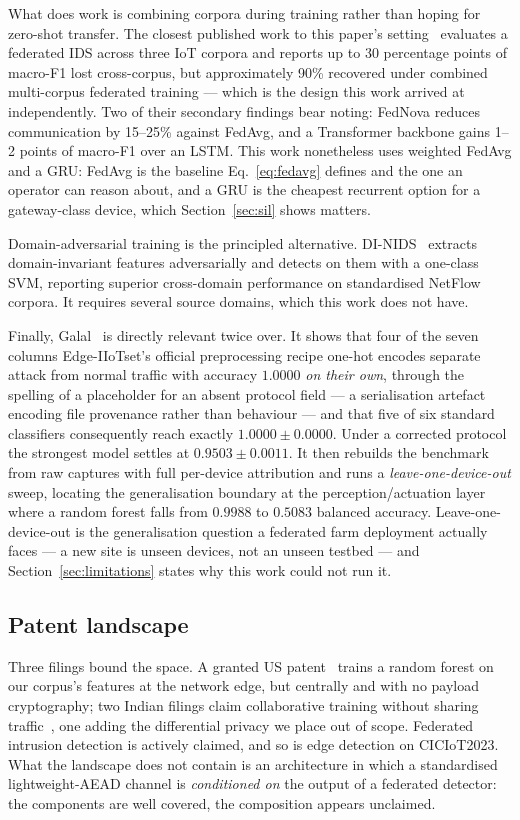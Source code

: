 \documentclass[conference]{IEEEtran}
\begin{document}
What does work is combining corpora during training rather than hoping for zero-shot transfer. The
closest published work to this paper's setting~\cite{dataset_centric_fl_ids} evaluates a federated
IDS across three IoT corpora and reports up to 30 percentage points of macro-F1 lost cross-corpus,
but approximately 90\% recovered under combined multi-corpus federated training --- which is the
design this work arrived at independently. Two of their secondary findings bear noting: FedNova
reduces communication by 15--25\% against FedAvg, and a Transformer backbone gains 1--2 points of
macro-F1 over an LSTM. This work nonetheless uses weighted FedAvg and a GRU: FedAvg is the
baseline Eq.~\eqref{eq:fedavg} defines and the one an operator can reason about, and a GRU is the
cheapest recurrent option for a gateway-class device, which Section~\ref{sec:sil} shows matters.

Domain-adversarial training is the principled alternative. DI-NIDS~\cite{layeghy2023dinids} extracts
domain-invariant features adversarially and detects on them with a one-class SVM, reporting
superior cross-domain performance on standardised NetFlow corpora. It requires several source
domains, which this work does not have.

Finally, Galal~\cite{galal2026provenance} is directly relevant twice over. It shows that four of
the seven columns Edge-IIoTset's official preprocessing recipe one-hot encodes separate attack
from normal traffic with accuracy $1.0000$ \emph{on their own}, through the spelling of a
placeholder for an absent protocol field --- a serialisation artefact encoding file provenance
rather than behaviour --- and that five of six standard classifiers consequently reach exactly
$1.0000 \pm 0.0000$. Under a corrected protocol the strongest model settles at $0.9503 \pm
0.0011$. It then rebuilds the benchmark from raw captures with full per-device attribution and
runs a \emph{leave-one-device-out} sweep, locating the generalisation boundary at the
perception/actuation layer where a random forest falls from $0.9988$ to $0.5083$ balanced
accuracy. Leave-one-device-out is the generalisation question a federated farm deployment actually
faces --- a new site is unseen devices, not an unseen testbed --- and
Section~\ref{sec:limitations} states why this work could not run it.

\subsection{Patent landscape}
Three filings bound the space. A granted US patent~\cite{patent_us12301597} trains a random forest
on our corpus's features at the network edge, but centrally and with no payload cryptography; two
Indian filings claim collaborative training without sharing
traffic~\cite{patent_vit_fl,patent_mallareddy}, one adding the differential privacy we place out
of scope. Federated intrusion detection is actively claimed, and so is edge detection on
CICIoT2023. What the landscape does not contain is an architecture in which a standardised
lightweight-AEAD channel is \emph{conditioned on} the output of a federated detector: the
components are well covered, the composition appears unclaimed.
\end{document}
